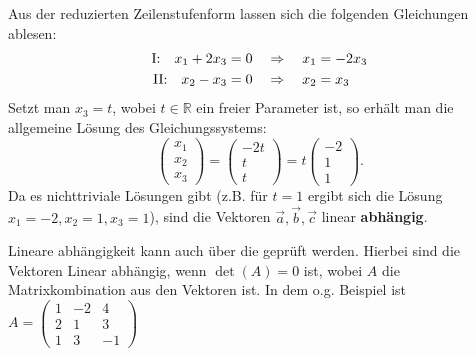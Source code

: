 Aus der reduzierten Zeilenstufenform lassen sich die folgenden Gleichungen
ablesen:
\begin{align*}
    \text{I:\@} \quad x_1 + 2x_3 & = 0 \quad \Rightarrow \quad x_1 = -2x_3 \\
    \text{II:\@} \quad x_2 - x_3 & = 0 \quad \Rightarrow \quad x_2 = x_3
\end{align*}
Setzt man $x_3 = t$, wobei $t \in \mathbb{R}$ ein freier Parameter ist, so erhält man die allgemeine Lösung des Gleichungssystems:
\[
    \begin{pmatrix} x_1 \\ x_2 \\ x_3 \end{pmatrix} = \begin{pmatrix} -2t \\ t \\ t \end{pmatrix} = t \begin{pmatrix} -2 \\ 1 \\ 1 \end{pmatrix}.
\]
Da es nichttriviale Lösungen gibt (z.B. für $t=1$ ergibt sich die Lösung
$x_1=-2, x_2=1, x_3=1$), sind die Vektoren $\vec{a}, \vec{b}, \vec{c}$ linear
\textbf{abhängig}.

Lineare abhängigkeit kann auch über die  geprüft werden.
Hierbei sind die Vektoren Linear abhängig, wenn $\det(A) = 0$ ist, wobei $A$
die Matrixkombination aus den Vektoren ist. In dem o.g. Beispiel ist $A = \begin{pmatrix}
        1 & -2 & 4  \\
        2 & 1  & 3  \\
        1 & 3  & -1
    \end{pmatrix}$